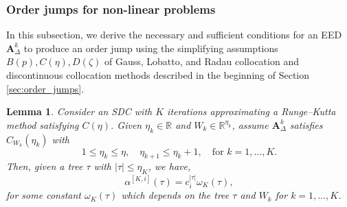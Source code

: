 \documentclass[sn-mathphys-num]{sn-jnl}%
\newcommand{\reva}[1]{#1}%
\theoremstyle{thmstyleone}%
\newtheorem{lemma}{Lemma}%
\theoremstyle{thmstyletwo}%
\theoremstyle{thmstylethree}%
\begin{document}
\subsubsection{Order jumps for non-linear problems}\label{sec:collocation_order_jump}
In this subsection, we derive the necessary and sufficient conditions for an EED $\bm{A}^k_\Delta$ to produce an order jump using the simplifying assumptions $B(p), C(\eta), D(\zeta)$ of Gauss, Lobatto, and Radau collocation \reva{and discontinuous collocation} methods described in the beginning of Section \ref{sec:order_jumps}.

\begin{lemma}\label{lemma:ai_eta_form}
    Consider an SDC with $K$ iterations \reva{approximating a Runge--Kutta method satisfying $C(\eta)$. Given $\eta_k \in \mathbb{R}$ and $W_k \in \mathbb{R}^{\eta_k}$, assume} $\bm{A}_\Delta^k$ satisfies $C_{W_k}(\eta_k)$ with
    \[ 1 \leq \eta_k \leq \eta, \quad \eta_{k+1} \leq \eta_k + 1, \quad \text{for } k = 1, \dots, K.\]
    Then, given a tree $\tau$ with $|\tau| \leq \eta_K$, we have,
    \begin{equation}\label{eq:ai_eta_form}
        \alpha^{[K,i]} (\tau) = c_i^{|\tau|} \omega_K (\tau),
    \end{equation}
    \reva{for some constant $\omega_K (\tau)$ which depends on the tree $\tau$ and $W_k$ for $k=1,\dots,K$.}
\end{lemma}
\end{document}
